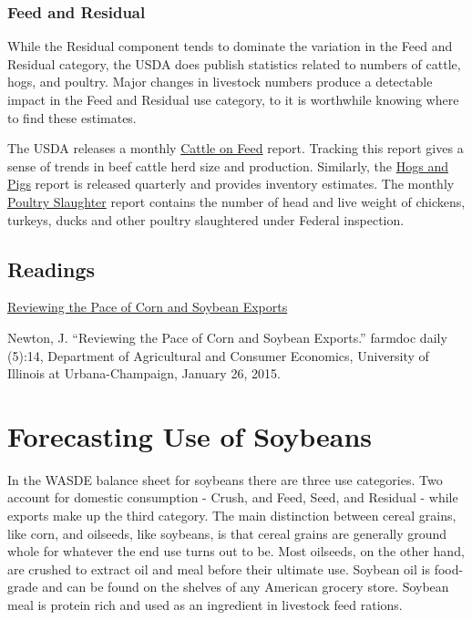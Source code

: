 \documentclass[
]{book}
\begin{document}
\hypertarget{feed-and-residual-1}{%
\subsection{Feed and Residual}\label{feed-and-residual-1}}

While the Residual component tends to dominate the variation in the Feed
and Residual category, the USDA does publish statistics related to
numbers of cattle, hogs, and poultry. Major changes in livestock numbers
produce a detectable impact in the Feed and Residual use category, to it
is worthwhile knowing where to find these estimates.

The USDA releases a monthly \href{http://usda.mannlib.cornell.edu/MannUsda/viewDocumentInfo.do?documentID=1020}{Cattle on
Feed}
report. Tracking this report gives a sense of trends in beef cattle herd
size and production. Similarly, the \href{http://usda.mannlib.cornell.edu/MannUsda/viewDocumentInfo.do?documentID=1086}{Hogs and
Pigs}
report is released quarterly and provides inventory estimates. The
monthly \href{https://usda.mannlib.cornell.edu/MannUsda/viewDocumentInfo.do?documentID=1131}{Poultry
Slaughter}
report contains the number of head and live weight of chickens, turkeys,
ducks and other poultry slaughtered under Federal inspection.

\hypertarget{readings-3}{%
\section{Readings}\label{readings-3}}

\href{http://farmdocdaily.illinois.edu/2015/01/reviewing-pace-of-corn-and-soybean-exports.html}{Reviewing the Pace of Corn and Soybean
Exports}

Newton, J. ``Reviewing the Pace of Corn and Soybean Exports.'' farmdoc
daily (5):14, Department of Agricultural and Consumer Economics,
University of Illinois at Urbana-Champaign, January 26, 2015.

\hypertarget{forecasting-use-of-soybeans}{%
\chapter{Forecasting Use of Soybeans}\label{forecasting-use-of-soybeans}}

In the WASDE balance sheet for soybeans there are three use categories. Two account for domestic consumption - Crush, and Feed, Seed, and Residual - while exports make up the third category. The main distinction between cereal grains, like corn, and oilseeds, like soybeans, is that cereal grains are generally ground whole for whatever the end use turns out to be. Most oilseeds, on the other hand, are crushed to extract oil and meal before their ultimate use. Soybean oil is food-grade and can be found on the shelves of any American grocery store. Soybean meal is protein rich and used as an ingredient in livestock feed rations.
\end{document}
